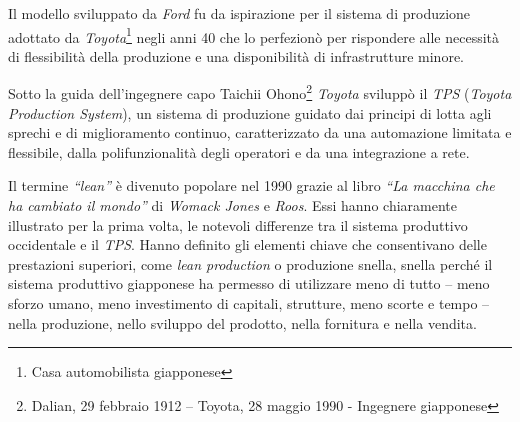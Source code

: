 Il modello sviluppato da \textit{Ford} fu da ispirazione per il sistema di produzione adottato da \textit{Toyota}\footnote{Casa automobilista giapponese} negli anni 40 che lo perfezionò per rispondere alle necessità di flessibilità della produzione e una disponibilità di infrastrutture minore.

Sotto la guida dell’ingegnere capo Taichii Ohono\footnote{Dalian, 29 febbraio 1912 – Toyota, 28 maggio 1990 - Ingegnere giapponese} \textit{Toyota} sviluppò il \textit{TPS} (\textit{Toyota Production System}), un sistema di produzione guidato dai principi di lotta agli sprechi e di miglioramento continuo, caratterizzato da una automazione limitata e flessibile, dalla polifunzionalità degli operatori e da una integrazione a rete.

Il termine \textit{“lean”} è divenuto popolare nel 1990 grazie al libro \textit{“La macchina che ha cambiato il mondo”} di \textit{Womack Jones} e \textit{Roos}. Essi hanno chiaramente illustrato per la prima volta, le notevoli differenze tra il sistema produttivo occidentale e il \textit{TPS}. Hanno definito gli elementi chiave che consentivano delle prestazioni superiori, come \textit{lean production} o produzione snella, snella perché il sistema produttivo giapponese ha permesso di utilizzare meno di tutto – meno sforzo umano, meno investimento di capitali, strutture, meno scorte e tempo – nella produzione, nello sviluppo del prodotto, nella fornitura e nella vendita.

